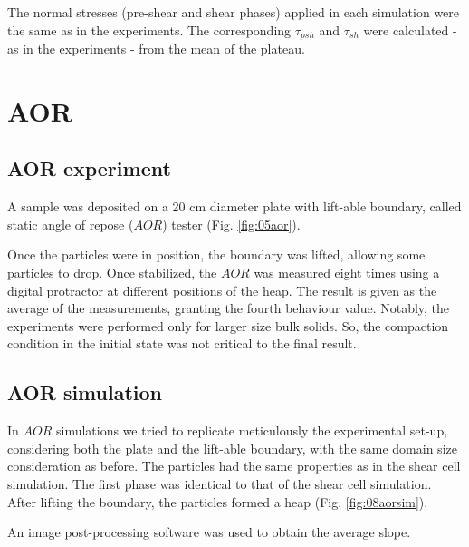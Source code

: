 \begin{appendix}
The normal stresses (pre-shear and shear phases) applied in each simulation were the same as in the experiments. The corresponding $\tau_{psh}$ and $\tau_{sh}$ were calculated - as in the experiments - from the mean of the plateau.\\

\section{AOR}
\label{sec:AOR}

\subsection{AOR experiment}
\label{subsec:aorexperiment}
A sample was deposited on a 20 cm diameter plate with lift-able boundary, called static angle of repose ($AOR$) tester (Fig. \ref{fig:05aor}).

Once the particles were in position, the boundary was lifted, allowing some particles to drop. Once stabilized, the $AOR$ was measured eight times using a digital protractor at different positions of the heap. The result is given as the average of the measurements, granting the fourth behaviour value.
Notably, the experiments were performed only for larger size bulk solids. So, the compaction condition in the initial state was not critical to the final result.

\subsection{AOR simulation}
\label{subsec:aorsimulation}
In $AOR$ simulations we tried to replicate meticulously the experimental set-up, considering both the plate and the lift-able boundary, with the same domain size consideration as before. The particles had the same properties as in the shear cell simulation. The first phase was identical to that of the shear cell simulation. 
After lifting the boundary, the particles formed a heap (Fig. \ref{fig:08aorsim}). 
 
An image post-processing software was used to obtain the average slope.

\end{appendix}\